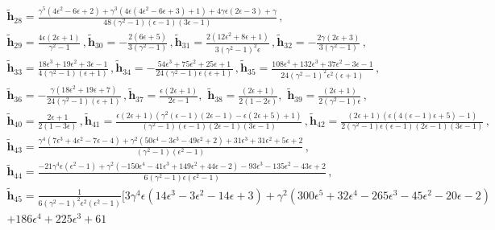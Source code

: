         \begin{align}\begin{split}
    & \boldsymbol{\tilde h}_{28}= \frac{\gamma ^5 \left(4 \epsilon ^2-6 \epsilon +2\right)+\gamma ^3 \left(4 \epsilon  \left(4 \epsilon ^2-6 \epsilon +3\right)+1\right)+4 \gamma  \epsilon  (2 \epsilon -3)+\gamma }{48 \left(\gamma ^2-1\right) (\epsilon -1) (3 \epsilon -1)}\,,\\&
   \boldsymbol{\tilde h}_{29}=\frac{4 \epsilon  (2 \epsilon +1)}{\gamma ^2-1}\,, \boldsymbol{\tilde h}_{30}=-\frac{2 (6 \epsilon +5)}{3 \left(\gamma ^2-1\right)}\,, \boldsymbol{\tilde h}_{31}=\frac{2 \left(12 \epsilon ^2+8 \epsilon +1\right)}{3 \left(\gamma ^2-1\right)^2 \epsilon }\,, \boldsymbol{\tilde h}_{32}=-\frac{2 \gamma  (2 \epsilon +3)}{3 \left(\gamma ^2-1\right)}\,,\\& \boldsymbol{\tilde h}_{33}=\frac{18 \epsilon ^3+19 \epsilon ^2+3 \epsilon -1}{4 \left(\gamma ^2-1\right) (\epsilon +1)}\,, \boldsymbol{\tilde h}_{34}=-\frac{54 \epsilon ^3+75 \epsilon ^2+25 \epsilon +1}{24 \left(\gamma ^2-1\right) \epsilon  (\epsilon +1)}\,, \boldsymbol{\tilde h}_{35}=\frac{108 \epsilon ^4+132 \epsilon ^3+37 \epsilon ^2-3 \epsilon -1}{24 \left(\gamma ^2-1\right)^2 \epsilon ^2 (\epsilon +1)}\,,\\& \boldsymbol{\tilde h}_{36}=-\frac{\gamma  \left(18 \epsilon ^2+19 \epsilon +7\right)}{24 \left(\gamma ^2-1\right) (\epsilon +1)}\,,\boldsymbol{\tilde h}_{37}=\frac{\epsilon  (2 \epsilon +1)}{2 \epsilon -1},\,\,\boldsymbol{\tilde h}_{38}=\frac{ (2 \epsilon +1)}{2(1-2 \epsilon) },\,\,\boldsymbol{\tilde h}_{39}=\frac{ (2 \epsilon +1)}{2 \left(\gamma ^2-1\right) \epsilon }\,,\\&\boldsymbol{\tilde h}_{40}=\frac{2 \epsilon +1}{2 (1-3 \epsilon )}\,,\boldsymbol{\tilde h}_{41}=\frac{\epsilon  (2 \epsilon +1) \left(\gamma ^2 (\epsilon -1) (2 \epsilon -1)-\epsilon  (2 \epsilon +5)+1\right)}{\left(\gamma ^2-1\right) (\epsilon -1) (2 \epsilon -1) (3 \epsilon -1)}\,,\boldsymbol{\tilde h}_{42}=\frac{(2 \epsilon +1) (\epsilon  (4 (\epsilon -1) \epsilon +5)-1)}{2 \left(\gamma ^2-1\right) \epsilon  (\epsilon -1) (2 \epsilon -1) (3 \epsilon -1)}\,,\\&\boldsymbol{\tilde h}_{43}=\frac{\gamma ^4 \left(7 \epsilon ^3+4 \epsilon ^2-7 \epsilon -4\right)+\gamma ^2 \left(50 \epsilon ^4-3 \epsilon ^3-49 \epsilon ^2+2\right)+31 \epsilon ^3+31 \epsilon ^2+5 \epsilon +2}{\left(\gamma ^2-1\right) \left(\epsilon ^2-1\right)}\,,\\& \boldsymbol{\tilde h}_{44}=\frac{-21 \gamma ^4 \epsilon  \left(\epsilon ^2-1\right)+\gamma ^2 \left(-150 \epsilon ^4-41 \epsilon ^3+149 \epsilon ^2+44 \epsilon -2\right)-93 \epsilon ^3-135 \epsilon ^2-43 \epsilon +2}{6 \left(\gamma ^2-1\right) \epsilon  \left(\epsilon ^2-1\right)}\,,\\&\boldsymbol{\tilde h}_{45}=\frac{1}{6 \left(\gamma ^2-1\right)^2 \epsilon ^2 \left(\epsilon ^2-1\right)}\Bigg[3 \gamma ^4 \epsilon  \left(14 \epsilon ^3-3 \epsilon ^2-14 \epsilon +3\right)+\gamma ^2 \left(300 \epsilon ^5+32 \epsilon ^4-265 \epsilon ^3-45 \epsilon ^2-20 \epsilon -2\right)\\&+186 \epsilon ^4+225 \epsilon ^3+61 
\end{split}
\end{align}
